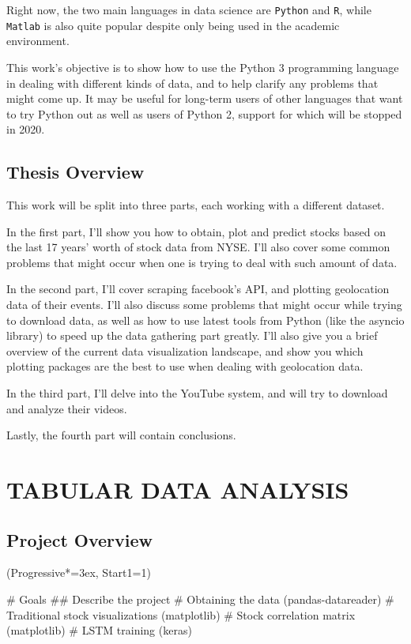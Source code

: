 \documentclass[12pt, a4paper]{article}
\let\OldEasylist\easylist
\let\OldEndEasylist\endeasylist
\renewenvironment{easylist}{%
    \OldEasylist%
    \ListProperties(Progressive*=3ex, Start1=1)%
}{%
    \OldEndEasylist%
}%
\begin{document}
Right now, the two main languages in data science are \texttt{Python} and \texttt{R}, while \texttt{Matlab} is also quite popular despite only being used in the academic environment.

This work's objective is to show how to use the Python 3 programming language in dealing with different kinds of data, and to help clarify any problems that might come up. It may be useful for long-term users of other languages that want to try Python out as well as users of Python 2, support for which will be stopped in 2020.
\subsection{Thesis Overview}
This work will be split into three parts, each working with a different dataset.

In the first part, I'll show you how to obtain, plot and predict stocks based on the last 17 years' worth of stock data from NYSE\footnotemark. I'll also cover some common problems that might occur when one is trying to deal with such amount of data.

In the second part, I'll cover scraping facebook's API, and plotting geolocation data of their events. I'll also discuss some problems that might occur while trying to download data, as well as how to use latest tools from Python (like the asyncio library) to speed up the data gathering part greatly. I'll also give you a brief overview of the current data visualization landscape, and show you which plotting packages are the best to use when dealing with geolocation data.

In the third part, I'll delve into the YouTube system, and will try to download and analyze their videos.

Lastly, the fourth part will contain conclusions.

\newpage
\section{TABULAR DATA ANALYSIS}

\subsection{Project Overview}
\begin{easylist}
# Goals
## Describe the project
# Obtaining the data (pandas-datareader)
# Traditional stock visualizations (matplotlib)
# Stock correlation matrix (matplotlib)
# LSTM training (keras)
\end{easylist}
\end{document}
